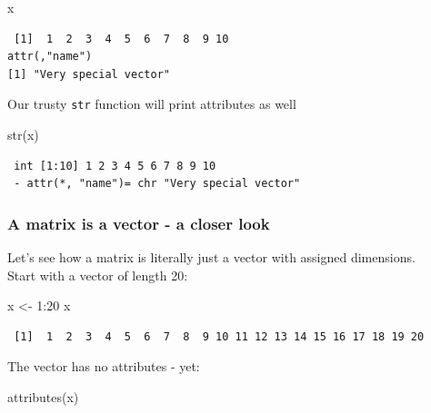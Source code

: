 \documentclass[
]{book}
\newenvironment{Shaded}{\begin{snugshade}}{\end{snugshade}}
\newcommand{\DecValTok}[1]{\textcolor[rgb]{0.00,0.00,0.81}{#1}}
\newcommand{\FunctionTok}[1]{\textcolor[rgb]{0.00,0.00,0.00}{#1}}
\newcommand{\NormalTok}[1]{#1}
\newcommand{\OtherTok}[1]{\textcolor[rgb]{0.56,0.35,0.01}{#1}}
\newcommand{\SpecialCharTok}[1]{\textcolor[rgb]{0.00,0.00,0.00}{#1}}
\begin{document}
\begin{Shaded}
\begin{Highlighting}[]
\NormalTok{x}
\end{Highlighting}
\end{Shaded}

\begin{verbatim}
 [1]  1  2  3  4  5  6  7  8  9 10
attr(,"name")
[1] "Very special vector"
\end{verbatim}

Our trusty \texttt{str} function will print attributes as well

\begin{Shaded}
\begin{Highlighting}[]
\FunctionTok{str}\NormalTok{(x)}
\end{Highlighting}
\end{Shaded}

\begin{verbatim}
 int [1:10] 1 2 3 4 5 6 7 8 9 10
 - attr(*, "name")= chr "Very special vector"
\end{verbatim}

\hypertarget{a-matrix-is-a-vector---a-closer-look}{%
\subsubsection{A matrix is a vector - a closer look}\label{a-matrix-is-a-vector---a-closer-look}}

Let's see how a matrix is literally just a vector with assigned dimensions.\\
Start with a vector of length 20:

\begin{Shaded}
\begin{Highlighting}[]
\NormalTok{x }\OtherTok{\textless{}{-}} \DecValTok{1}\SpecialCharTok{:}\DecValTok{20}
\NormalTok{x}
\end{Highlighting}
\end{Shaded}

\begin{verbatim}
 [1]  1  2  3  4  5  6  7  8  9 10 11 12 13 14 15 16 17 18 19 20
\end{verbatim}

The vector has no attributes - yet:

\begin{Shaded}
\begin{Highlighting}[]
\FunctionTok{attributes}\NormalTok{(x)}
\end{Highlighting}
\end{Shaded}
\end{document}
